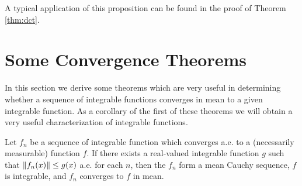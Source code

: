 A typical application of this proposition can be found in the proof of Theorem \ref{thm:dct}.

\section{Some Convergence Theorems}

In this section we derive some theorems which are very useful in determining whether a sequence of integrable functions converges in mean to a given integrable function. As a corollary of the first of these theorems we will obtain a very useful characterization of integrable functions.

\begin{theorem}\label{thm:dct}
Let $f_n$ be a sequence of integrable function which converges a.e. to a (necessarily measurable) function $f$. If there exists a real-valued integrable function $g$ such that $\norm{f_n(x)}\leq g(x)$ a.e. for each $n$, then the $f_n$ form a mean Cauchy sequence, $f$ is integrable, and $f_n$ converges to $f$ in mean.
\end{theorem}

